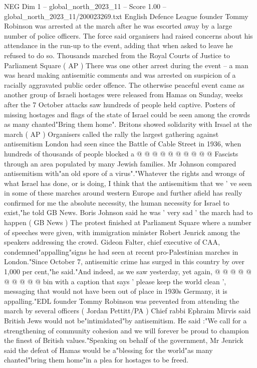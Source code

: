 \begin{textsample}{NEG Dim 1 – global\_north\_2023\_11 – Score 1.00 – global\_north\_2023\_11/200023269.txt}  \label{ex:f1_neg_101}
English Defence League founder Tommy Robinson was arrested at the march after he was escorted away by a large number of police officers.
The force said organisers had raised concerns about his attendance in the run-up to the event, adding that when asked to leave he refused to do so.
Thousands marched from the Royal Courts of Justice to Parliament Square ( AP ) There was one other arrest during the event -- a man was heard making antisemitic comments and was arrested on suspicion of a racially aggravated public order offence.
The otherwise peaceful event came as another group of Israeli hostages were released from Hamas on Sunday, weeks after the 7 October attacks saw hundreds of people held captive.
Posters of missing hostages and flags of the state of Israel could be seen among the crowds as many chanted"Bring them home".
Britons showed solidarity with Irsael at the march ( AP ) Organisers called the rally the largest gathering against antisemitism London had seen since the Battle of Cable Street in 1936, when hundreds of thousands of people blocked a @ @ @ @ @ @ @ @ @ @ Fascists through an area populated by many Jewish families.
Mr Johnson compared antisemitism with"an old spore of a virus"."Whatever the rights and wrongs of what Israel has done, or is doing, I think that the antisemitism that we ' ve seen in some of these marches around western Europe and further afield has really confirmed for me the absolute necessity, the human necessity for Israel to exist,"he told GB News.
Boris Johnson said he was ' very sad ' the march had to happen ( GB News ) The protest finished at Parliament Square where a number of speeches were given, with immigration minister Robert Jenrick among the speakers addressing the crowd.
Gideon Falter, chief executive of CAA, condemned"appalling"signs he had seen at recent pro-Palestinian marches in London."Since October 7, antisemitic crime has surged in this country by over 1,000 per cent,"he said."And indeed, as we saw yesterday, yet again, @ @ @ @ @ @ @ @ @ @ bin with a caption that says ' please keep the world clean ', messaging that would not have been out of place in 1930s Germany, it is appalling."EDL founder Tommy Robinson was prevented from attending the march by several officers ( Jordan Pettitt/PA ) Chief rabbi Ephraim Mirvis said British Jews would not be"intimidated"by antisemitism.
He said :"We call for a strengthening of community cohesion and we will forever be proud to champion the finest of British values."Speaking on behalf of the government, Mr Jenrick said the defeat of Hamas would be a"blessing for the world"as many chanted"bring them home"in a plea for hostages to be freed.

\end{textsample}
